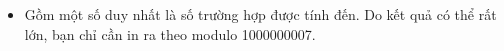 \begin{itemize}
	\item     Gồm một số duy nhất là số trường hợp được tính đến. Do kết quả có thể rất lớn, bạn chỉ cần in ra theo modulo 1000000007.   
\end{itemize}